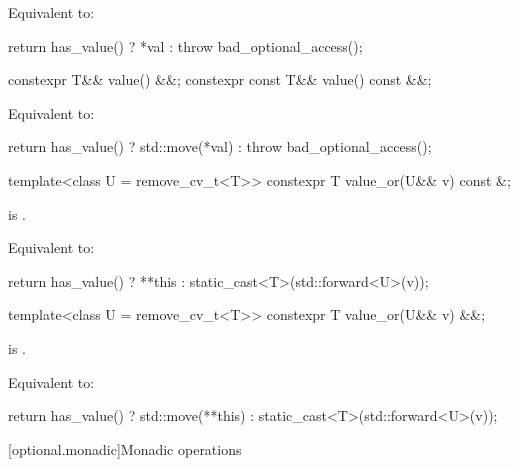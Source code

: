 \begin{itemdescr}
\pnum
\effects
Equivalent to:
\begin{codeblock}
return has_value() ? *val : throw bad_optional_access();
\end{codeblock}
\end{itemdescr}

%
\begin{itemdecl}
constexpr T&& value() &&;
constexpr const T&& value() const &&;
\end{itemdecl}

\begin{itemdescr}

\pnum
\effects
Equivalent to:
\begin{codeblock}
return has_value() ? std::move(*val) : throw bad_optional_access();
\end{codeblock}
\end{itemdescr}

%
\begin{itemdecl}
template<class U = remove_cv_t<T>> constexpr T value_or(U&& v) const &;
\end{itemdecl}

\begin{itemdescr}
\pnum
\mandates
{} is .

\pnum
\effects
Equivalent to:
\begin{codeblock}
return has_value() ? **this : static_cast<T>(std::forward<U>(v));
\end{codeblock}
\end{itemdescr}

%
\begin{itemdecl}
template<class U = remove_cv_t<T>> constexpr T value_or(U&& v) &&;
\end{itemdecl}

\begin{itemdescr}
\pnum
\mandates
{} is .

\pnum
\effects
Equivalent to:
\begin{codeblock}
return has_value() ? std::move(**this) : static_cast<T>(std::forward<U>(v));
\end{codeblock}
\end{itemdescr}

[optional.monadic]{Monadic operations}

